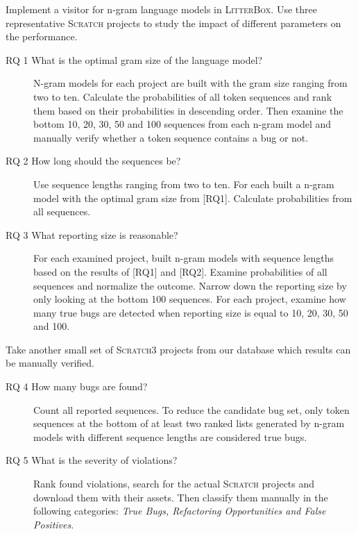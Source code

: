 \documentclass[
    numbers=noenddot,
    parskip=half-,
    fontsize=12pt,
    paper=a4,
    oneside,
    titlepage,
    bibliography=totoc,
    chapterprefix=false,
]{scrbook}
\newcommand{\litterbox}{\textsc{LitterBox}}
\newcommand{\scratch}{\textsc{Scratch}}
\begin{document}
    Implement a visitor for n-gram language models in \litterbox{}. Use three representative \scratch{} projects to study the impact of different parameters on the performance.  
    
    \begin{description}
        \item[RQ 1 What is the optimal gram size of the language model?] 
        N-gram models for each project are built with the gram size ranging from two to ten. Calculate the probabilities of all token sequences and rank them based on their probabilities in descending order. Then examine the bottom 10, 20, 30, 50 and 100 sequences from each n-gram model and manually verify whether a token sequence contains a bug or not.
        \item[RQ 2 How long should the sequences be?]
        Use sequence lengths ranging from two to ten. For each built a n-gram model with the optimal gram size from [RQ1]. Calculate probabilities from all sequences.
        \item[RQ 3 What reporting size is reasonable?]
        For each examined project, built n-gram models with sequence lengths based on the results of [RQ1] and [RQ2]. Examine probabilities of all sequences and normalize the outcome. Narrow down the reporting size by only looking at the bottom 100 sequences. For each project, examine how many true bugs are detected when reporting size is equal to 10, 20, 30, 50 and 100.
    \end{description}

	Take another small set of \scratch{3} projects from our database which results can be manually verified.
	
    \begin{description}
        \item[RQ 4 How many bugs are found?] 
        Count all reported sequences. To reduce the candidate bug set, only token sequences at the bottom of at least two ranked lists generated by n-gram models with different sequence lengths are considered true bugs.
        \item[RQ 5 What is the severity of violations?] 
        Rank found violations, search for the actual \scratch{} projects and download them with their assets. Then classify them manually in the following categories: \textit{True Bugs, Refactoring Opportunities and False Positives}.
    \end{description}
 


    \backmatter

    \printbibliography
\end{document}
